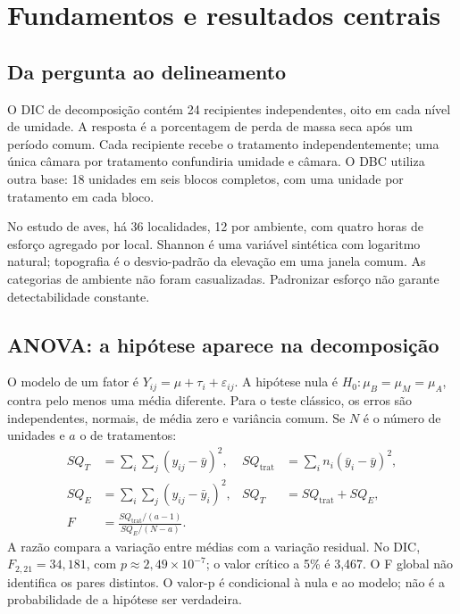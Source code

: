 \chapter{Fundamentos e resultados centrais}
\section{Da pergunta ao delineamento}
O DIC de decomposição contém 24 recipientes independentes, oito em cada nível de umidade. A resposta é a porcentagem de perda de massa seca após um período comum. Cada recipiente recebe o tratamento independentemente; uma única câmara por tratamento confundiria umidade e câmara. O DBC utiliza outra base: 18 unidades em seis blocos completos, com uma unidade por tratamento em cada bloco.

No estudo de aves, há 36 localidades, 12 por ambiente, com quatro horas de esforço agregado por local. Shannon é uma variável sintética com logaritmo natural; topografia é o desvio-padrão da elevação em uma janela comum. As categorias de ambiente não foram casualizadas. Padronizar esforço não garante detectabilidade constante.

\section{ANOVA: a hipótese aparece na decomposição}
O modelo de um fator é $Y_{ij}=\mu+\tau_i+\varepsilon_{ij}$. A hipótese nula é $H_0:\mu_B=\mu_M=\mu_A$, contra pelo menos uma média diferente. Para o teste clássico, os erros são independentes, normais, de média zero e variância comum. Se $N$ é o número de unidades e $a$ o de tratamentos:
\begin{align}
SQ_T&=\sum_i\sum_j(y_{ij}-\bar y)^2,
&SQ_{\mathrm{trat}}&=\sum_i n_i(\bar y_i-\bar y)^2,\\
SQ_E&=\sum_i\sum_j(y_{ij}-\bar y_i)^2,
&SQ_T&=SQ_{\mathrm{trat}}+SQ_E,\\
F&=\frac{SQ_{\mathrm{trat}}/(a-1)}{SQ_E/(N-a)}.
\end{align}
A razão compara a variação entre médias com a variação residual. No DIC, $F_{2,21}=34{,}181$, com $p\approx2{,}49\times10^{-7}$; o valor crítico a 5\% é 3,467. O F global não identifica os pares distintos. O valor-p é condicional à nula e ao modelo; não é a probabilidade de a hipótese ser verdadeira.

